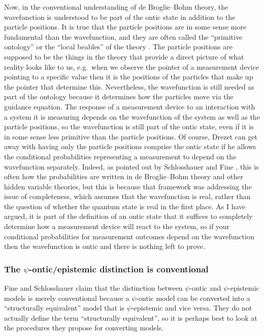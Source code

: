 \documentclass[DIV=calc,fontsize=12pt]{scrartcl} %
\theoremstyle{definition}
\theoremstyle{plain}
\begin{document}
Now, in the conventional understanding of de Broglie--Bohm theory, the
wavefunction is understood to be part of the ontic state in addition
to the particle positions.  It is true that the particle positions are
in some sense more fundamental than the wavefunction, and they are
often called the ``primitive ontology'' \cite{Duerr1992,
Goldstein1998, Goldstein1998a} or the ``local beables'' of the
theory \cite{Bell2004}.  The particle positions are supposed to be the
things in the theory that provide a direct picture of what reality
looks like to us, e.g.\ when we observe the pointer of a measurement
device pointing to a specific value then it is the positions of the
particles that make up the pointer that determine this.  Nevertheless,
the wavefunction is still needed as part of the ontology because it
determines how the particles move via the guidance equation.  The
response of a measurement device to an interaction with a system it is
measuring depends on the wavefunction of the system as well as the
particle positions, so the wavefunction is still part of the ontic
state, even if it is in some sense less primitive than the particle
positions.  Of course, Drezet can get away with having only the
particle positions comprise the ontic state if he allows the
conditional probabilities representing a measurement to depend on the
wavefunction separately.  Indeed, as pointed out by Schlosshauer and
Fine \cite{Schlosshauer2012}, this is often how the probabilities are
written in de Broglie--Bohm theory and other hidden variable theories,
but this is because that framework was addressing the issue of
completeness, which assumes that the wavefunction is real, rather than
the question of whether the quantum state is real in the first place.
As I have argued, it is part of the definition of an ontic state that
it suffices to completely determine how a measurement device will
react to the system, so if your conditional probabilities for
measurement outcomes depend on the wavefunction then the wavefunction
is ontic and there is nothing left to prove.

\subsubsection{The $\psi$-ontic/epistemic distinction is conventional}

\label{Crit:SF1}

Fine and Schlosshauer \cite{Schlosshauer2012} claim that the
distinction between $\psi$-ontic and $\psi$-epistemic models is merely
conventional because a $\psi$-ontic model can be converted into a
``structurally equivalent'' model that is $\psi$-epistemic and vice
versa.  They do not actually define the term ``structurally
equivalent'', so it is perhaps best to look at the procedures they
propose for converting models.
\end{document}
